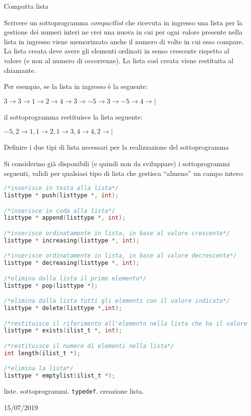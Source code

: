 \begin{exrev}{Compatta lista}

Scrivere un sottoprogramma \textit{compactlist} che ricevuta in ingresso una lista per la gestione dei numeri interi ne crei una nuova in cui per ogni valore presente nella lista in ingresso viene memorizzato anche il numero di volte in cui esso compare. La lista creata deve avere gli elementi ordinati in senso crescente rispetto al valore (e non al numero di occorrenze). La lista cos\`i creata viene restituita al chiamante.

Per esempio, se la lista in ingresso \`e la seguente:

$3 \rightarrow 3 \rightarrow 1 \rightarrow 2 \rightarrow 4 \rightarrow 3 \rightarrow -5 \rightarrow 3 \rightarrow -5 \rightarrow 4 \rightarrow |$

il sottoprogramma restituisce la lista seguente:

$-5,2 \rightarrow 1,1 \rightarrow 2,1 \rightarrow 3,4 \rightarrow 4,2 \rightarrow |$

Definire i due tipi di lista necessari per la realizzazione del sottoprogramma

Si considerino gi\`a disponibili (e quindi non da sviluppare) i sottoprogrammi seguenti, validi per qualsiasi tipo di lista che gestisca “almeno” un campo intero:

\begin{lstlisting}[language=c]
/*inserisce in testa alla lista*/
listtype * push(listtype *, int);

/*inserisce in coda alla lista*/
listtype * append(listtype *, int);

/*inserisce ordinatamente in lista, in base al valore crescente*/
listtype * increasing(listtype *, int);

/*inserisce ordinatamente in lista, in base al valore decrescente*/
listtype * decreasing(listtype *, int);

/*elimina dalla lista il primo elemento*/
listtype * pop(listtype *);

/*elimina dalla lista tutti gli elementi con il valore indicato*/
listtype * delete(listtype *,int);

/*restituisce il riferimento all'elemento nella lista che ha il valore indicato, se esiste, NULL altrimenti*/
listtype * exists(ilist_t *, int);

/*restituisce il numero di elementi nella lista*/
int length(ilist_t *);

/*elimina la lista*/
listtype * emptylist(ilist_t *);
\end{lstlisting}


\begin{tags}
liste. sottoprogrammi. \texttt{typedef}. creazione lista.
\end{tags}

\begin{esame}
15/07/2019
\end{esame}


\end{exrev}

